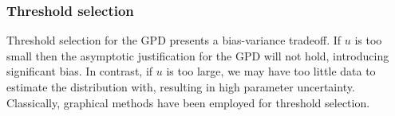 \documentclass{article}
\numberwithin{equation}{section}
\begin{document}
\subsubsection{Threshold selection} \label{subsubsec:threshold}
Threshold selection for the GPD presents a bias-variance tradeoff. 
If $u$ is too small then the asymptotic justification for the GPD will not hold,  introducing significant bias.
In contrast, if $u$ is too large, we may have too little data to estimate the distribution with, resulting in high parameter uncertainty.
Classically, graphical methods have been employed for threshold selection.
\end{document}
